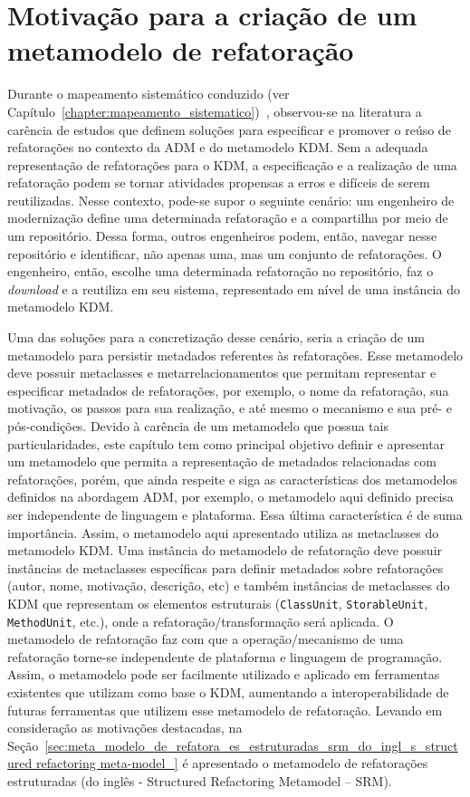 \section{Motivação para a criação de um metamodelo de refatoração} %
\label{sec:motiva_o_para_a_cria_o_de_um_meta_modelo_de_refatora_o}

Durante o mapeamento sistemático conduzido (ver Capítulo~\ref{chapter:mapeamento_sistematico})~\cite{durelli_systematic_mapping}, observou-se na literatura a carência de estudos que definem soluções para especificar e promover o reúso de refatorações no contexto da ADM e do metamodelo KDM. Sem a adequada representação de refatorações para o KDM, a especificação e a realização de uma refatoração podem se tornar atividades propensas a erros e difíceis de serem reutilizadas. Nesse contexto, pode-se supor o seguinte cenário: um engenheiro de modernização define uma determinada refatoração e a compartilha por meio de um repositório. Dessa forma, outros engenheiros podem, então, navegar nesse repositório e identificar, não apenas uma, mas um conjunto de refatorações. O engenheiro, então, escolhe uma determinada refatoração no repositório, faz o \textit{download} e a reutiliza em seu sistema, representado em nível de uma instância do metamodelo KDM. 

Uma das soluções para a concretização desse cenário, seria a criação de um metamodelo para persistir metadados referentes às refatorações. Esse metamodelo deve possuir metaclasses e metarrelacionamentos que permitam representar e especificar metadados de refatorações, por exemplo, o nome da refatoração, sua motivação, os passos para sua realização, e até mesmo o mecanismo e sua pré- e pós-condições. Devido à carência de um metamodelo que possua tais particularidades, este capítulo tem como principal objetivo definir e apresentar um metamodelo que permita a representação de metadados relacionadas com refatorações, porém, que ainda respeite e siga as características dos metamodelos definidos na abordagem ADM, por exemplo, o metamodelo aqui definido precisa ser independente de linguagem e plataforma. Essa última característica é de suma importância. Assim, o metamodelo aqui apresentado utiliza as metaclasses do metamodelo KDM. Uma instância do metamodelo de refatoração deve possuir instâncias de metaclasses específicas para definir metadados sobre refatorações (autor, nome, motivação, descrição, etc) e também instâncias de metaclasses do KDM que representam os elementos estruturais (\texttt{ClassUnit}, \texttt{StorableUnit}, \texttt{MethodUnit}, etc.), onde a refatoração/transformação será aplicada. O metamodelo de refatoração faz com que a operação/mecanismo de uma refatoração torne-se independente de plataforma e linguagem de programação. Assim, o metamodelo pode ser facilmente utilizado e aplicado em ferramentas existentes que utilizam como base o KDM, aumentando a interoperabilidade de futuras ferramentas que utilizem esse metamodelo de refatoração. Levando em consideração as motivações destacadas, na Seção~\ref{sec:meta_modelo_de_refatora_es_estruturadas_srm_do_ingl_s_structured refactoring meta-model_} é apresentado o metamodelo de refatorações estruturadas (do inglês - Structured Refactoring Metamodel – SRM).  


